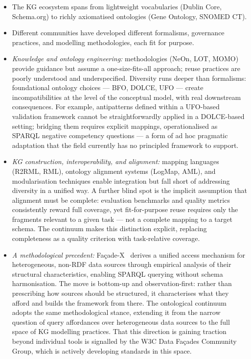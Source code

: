 \documentclass[runningheads]{llncs}
\begin{document}
\begin{itemize}
    \item The KG ecosystem spans from lightweight vocabularies (Dublin Core, Schema.org) to richly axiomatised ontologies (Gene Ontology, SNOMED CT).
    \item Different communities have developed different formalisms, governance practices, and modelling methodologies, each fit for purpose.
    \item \textit{Knowledge and ontology engineering:} methodologies (NeOn, LOT, MOMO) provide guidance but assume a one-size-fits-all approach; reuse practices are poorly understood and underspecified. Diversity runs deeper than formalisms: foundational ontology choices --- BFO, DOLCE, UFO --- create incompatibilities at the level of the conceptual model, with real downstream consequences. For example, antipatterns defined within a UFO-based validation framework cannot be straightforwardly applied in a DOLCE-based setting; bridging them requires explicit mappings, operationalised as SPARQL negative competency questions --- a form of ad hoc pragmatic adaptation that the field currently has no principled framework to support. %
	\item \textit{KG construction, interoperability, and alignment:} mapping languages (R2RML, RML), ontology alignment systems (LogMap, AML), and modularisation techniques enable integration but fall short of addressing diversity in a unified way. A further blind spot is the implicit assumption that alignment must be complete: evaluation benchmarks and quality metrics consistently reward full coverage, yet fit-for-purpose reuse requires only the fragments relevant to a given task --- not a complete mapping to a target schema. The continuum makes this distinction explicit, replacing completeness as a quality criterion with task-relative coverage. %
    \item \textit{A methodological precedent:} Fa\c{c}ade-X~\cite{facadex} derives a unified access mechanism for heterogeneous, non-RDF data sources through empirical analysis of their structural characteristics, enabling SPARQL querying without schema harmonisation. The move is bottom-up and observation-first: rather than prescribing how sources should be structured, it characterises what they afford and builds the framework from there. The ontological continuum adopts the same methodological stance, extending it from the narrow question of query affordances over heterogeneous data sources to the full space of KG modelling practices. That this direction is gaining traction beyond individual tools is signalled by the W3C Data Fa\c{c}ades Community Group, which is actively developing standards in this space.

\end{itemize}
\end{document}
